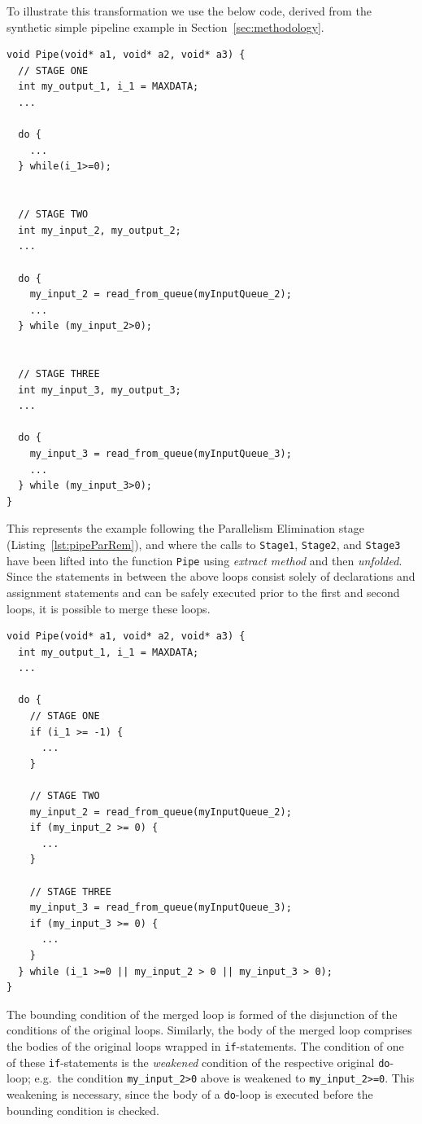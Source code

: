 To illustrate this transformation we use the below code, derived from the synthetic simple pipeline example in Section~\ref{sec:methodology}.
%
\begin{lstlisting}[caption=Intermediate Code Repair Stage for Simple Pipeline Example, label=lst:refac:repair:before]
void Pipe(void* a1, void* a2, void* a3) {
  // STAGE ONE
  int my_output_1, i_1 = MAXDATA;
  ...

  do {
    ...
  } while(i_1>=0);

  
  // STAGE TWO
  int my_input_2, my_output_2;
  ...

  do {
    my_input_2 = read_from_queue(myInputQueue_2);
    ...
  } while (my_input_2>0);


  // STAGE THREE
  int my_input_3, my_output_3;
  ...

  do {
    my_input_3 = read_from_queue(myInputQueue_3);
    ...
  } while (my_input_3>0);
}
\end{lstlisting}
%
\noindent
This represents the example following the Parallelism Elimination stage (Listing~\ref{lst:pipeParRem}), and where the calls to \lstinline|Stage1|, \lstinline|Stage2|, and \lstinline|Stage3| have been lifted into the function \lstinline|Pipe| using \emph{extract method} and then \emph{unfolded}. Since the statements in between the above loops consist solely of declarations and assignment statements and can be safely executed prior to the first and second loops, it is possible to merge these loops.
%
\begin{lstlisting}[caption=Following Merging of loops in Listing~\ref{lst:refac:repair:before}), label=lst:refac:repair:after]
void Pipe(void* a1, void* a2, void* a3) {
  int my_output_1, i_1 = MAXDATA;
  ...

  do {
    // STAGE ONE
    if (i_1 >= -1) {
      ...
    }

    // STAGE TWO
    my_input_2 = read_from_queue(myInputQueue_2);
    if (my_input_2 >= 0) {
      ...
    }

    // STAGE THREE
    my_input_3 = read_from_queue(myInputQueue_3);
    if (my_input_3 >= 0) {
      ...
    }
  } while (i_1 >=0 || my_input_2 > 0 || my_input_3 > 0);
}
\end{lstlisting}
%
The bounding condition of the merged loop is formed of the disjunction of the conditions of the original loops. Similarly, the body of the merged loop comprises the bodies of the original loops wrapped in \lstinline{if}-statements. The condition of one of these \lstinline{if}-statements is the \emph{weakened} condition of the respective original \lstinline{do}-loop; e.g.\ the condition \lstinline|my_input_2>0| above is weakened to \lstinline|my_input_2>=0|. This weakening is necessary, since the body of a \lstinline{do}-loop is executed before the bounding condition is checked.
